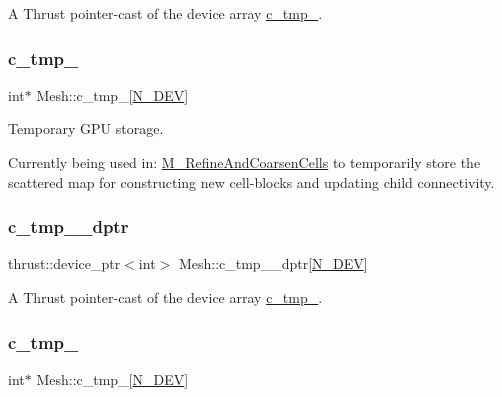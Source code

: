 A Thrust pointer-\/cast of the device array \hyperlink{classMesh_a2d6d66223791e211c83a72f9114f8845}{c\+\_\+tmp\+\_}. 

\mbox{\label{classMesh_a167ed8797ff5b96dc9c50fef4061abfb}} 
\subsubsection{\texorpdfstring{c\+\_\+tmp\+\_}{c\_tmp\_2}}
{\footnotesize\ttfamily int$\ast$ Mesh\+::c\+\_\+tmp\+\_\mbox{[}\hyperlink{cppspec_8h_a2b674dab7a14f1bf32b48b7fda5022dc}{N\+\_\+\+D\+EV}\mbox{]}\hspace{0.3cm}{\ttfamily [private]}}



Temporary G\+PU storage. 

Currently being used in\+: \hyperlink{classMesh_a7f1c861db5b8168cff9dabf728c0ce1a}{M\+\_\+\+Refine\+And\+Coarsen\+Cells} to temporarily store the scattered map for constructing new cell-\/blocks and updating child connectivity. \mbox{\label{classMesh_aad2ad266ce1e7ccc6fef15a302a99d39}} 
\subsubsection{\texorpdfstring{c\+\_\+tmp\+\_\+\_\+dptr}{c\_tmp\_2\_dptr}}
{\footnotesize\ttfamily thrust\+::device\+\_\+ptr$<$int$>$ Mesh\+::c\+\_\+tmp\+\_\+\_\+dptr\mbox{[}\hyperlink{cppspec_8h_a2b674dab7a14f1bf32b48b7fda5022dc}{N\+\_\+\+D\+EV}\mbox{]}\hspace{0.3cm}{\ttfamily [private]}}



A Thrust pointer-\/cast of the device array \hyperlink{classMesh_a167ed8797ff5b96dc9c50fef4061abfb}{c\+\_\+tmp\+\_}. 

\mbox{\label{classMesh_a7cdb75040bd5f280fd1b019ea99383ac}} 
\subsubsection{\texorpdfstring{c\+\_\+tmp\+\_}{c\_tmp\_3}}
{\footnotesize\ttfamily int$\ast$ Mesh\+::c\+\_\+tmp\+\_\mbox{[}\hyperlink{cppspec_8h_a2b674dab7a14f1bf32b48b7fda5022dc}{N\+\_\+\+D\+EV}\mbox{]}\hspace{0.3cm}{\ttfamily [private]}}




